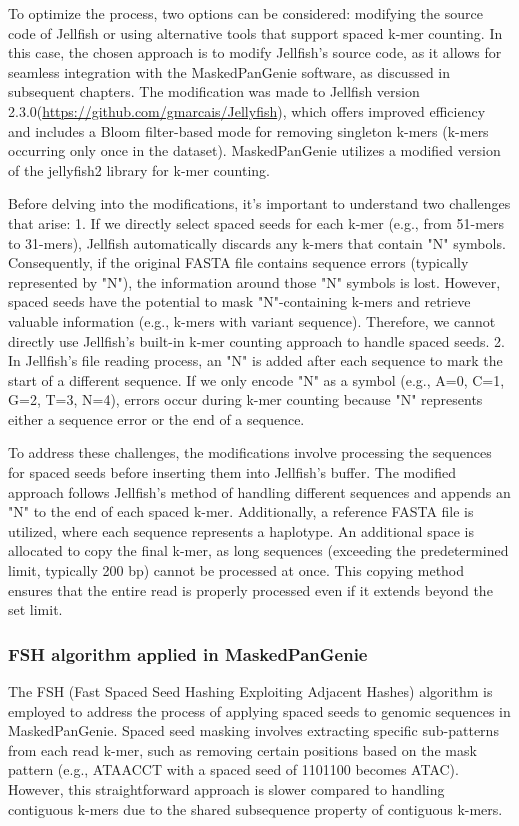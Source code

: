 \documentclass{PHlab-thesis}
\begin{document}
To optimize the process, two options can be considered: modifying the source code of Jellfish or using alternative tools that support spaced k-mer counting. In this case, the chosen approach is to modify Jellfish's source code, as it allows for seamless integration with the MaskedPanGenie software, as discussed in subsequent chapters. The modification was made to Jellfish version 2.3.0(\url{https://github.com/gmarcais/Jellyfish}), which offers improved efficiency and includes a Bloom filter-based mode for removing singleton k-mers (k-mers occurring only once in the dataset). MaskedPanGenie utilizes a modified version of the jellyfish2 library for k-mer counting.

Before delving into the modifications, it's important to understand two challenges that arise:
1. If we directly select spaced seeds for each k-mer (e.g., from 51-mers to 31-mers), Jellfish automatically discards any k-mers that contain "N" symbols. Consequently, if the original FASTA file contains sequence errors (typically represented by "N"), the information around those "N" symbols is lost. However, spaced seeds have the potential to mask "N"-containing k-mers and retrieve valuable information (e.g., k-mers with variant sequence). Therefore, we cannot directly use Jellfish's built-in k-mer counting approach to handle spaced seeds.
2. In Jellfish's file reading process, an "N" is added after each sequence to mark the start of a different sequence. If we only encode "N" as a symbol (e.g., A=0, C=1, G=2, T=3, N=4), errors occur during k-mer counting because "N" represents either a sequence error or the end of a sequence.

To address these challenges, the modifications involve processing the sequences for spaced seeds before inserting them into Jellfish's buffer. The modified approach follows Jellfish's method of handling different sequences and appends an "N" to the end of each spaced k-mer. Additionally, a reference FASTA file is utilized, where each sequence represents a haplotype. An additional space is allocated to copy the final k-mer, as long sequences (exceeding the predetermined limit, typically 200 bp) cannot be processed at once. This copying method ensures that the entire read is properly processed even if it extends beyond the set limit.
\subsubsection{FSH\cite{Girotto2018FSH} algorithm applied in MaskedPanGenie}
The FSH (Fast Spaced Seed Hashing Exploiting Adjacent Hashes) algorithm is employed to address the process of applying spaced seeds to genomic sequences in MaskedPanGenie. Spaced seed masking involves extracting specific sub-patterns from each read k-mer, such as removing certain positions based on the mask pattern (e.g., ATAACCT with a spaced seed of 1101100 becomes ATAC). However, this straightforward approach is slower compared to handling contiguous k-mers due to the shared subsequence property of contiguous k-mers.
\end{document}
